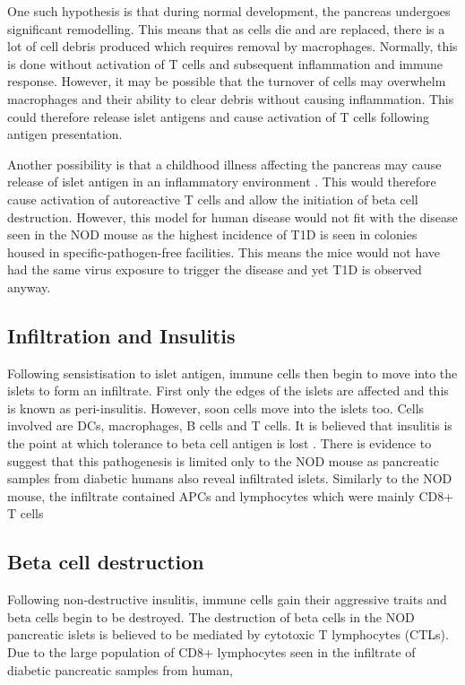 One such hypothesis is that during normal development, the pancreas undergoes significant remodelling.
This means that as cells die and are replaced, there is a lot of cell debris produced which requires removal by macrophages.
Normally, this is done without activation of T cells and subsequent inflammation and immune response.
However, it may be possible that the turnover of cells may overwhelm macrophages and their ability to clear debris without causing inflammation.
This could therefore release islet antigens and cause activation of T cells following antigen presentation.

Another possibility is that a childhood illness affecting the pancreas may cause release of islet antigen in an inflammatory environment \citep{Green1999}.
This would therefore cause activation of autoreactive T cells and allow the initiation of beta cell destruction.
However, this model for human disease would not fit with the disease seen in the NOD mouse as the highest incidence of T1D is seen in colonies housed in specific-pathogen-free facilities\citep{Delovitch1997}.
This means the mice would not have had the same virus exposure to trigger the disease and yet T1D is observed anyway.

\subsection{Infiltration and Insulitis}

Following sensistisation to islet antigen, immune cells then begin to move into the islets to form an infiltrate.
First only the edges of the islets are affected and this is known as peri-insulitis\citep{Thomas2000}.
However, soon cells move into the islets too.
Cells involved are DCs, macrophages, B cells and T cells\citep{Brodie2008}.
It is believed that insulitis is the point at which tolerance to beta cell antigen is lost \citep{Thomas2000}.
There is evidence to suggest that this pathogenesis is limited only to the NOD mouse as pancreatic samples from diabetic humans also reveal infiltrated islets.
Similarly to the NOD mouse, the infiltrate contained APCs and lymphocytes which were mainly CD8+ T cells \citep{Hanafusa2008}

\subsection{Beta cell destruction}

Following non-destructive insulitis, immune cells gain their aggressive traits and beta cells begin to be destroyed.
The destruction of beta cells in the NOD pancreatic islets is believed to be mediated by cytotoxic T lymphocytes (CTLs)\citep{Thomas2000, Brodie2008}.
Due to the large population of CD8+ lymphocytes seen in the infiltrate of diabetic pancreatic samples from human, 



